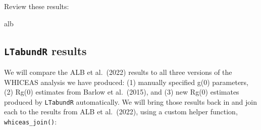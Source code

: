 \documentclass[
]{book}
\newenvironment{Shaded}{\begin{snugshade}}{\end{snugshade}}
\newcommand{\NormalTok}[1]{#1}
\begin{document}
Review these results:

\begin{Shaded}
\begin{Highlighting}[]
\NormalTok{alb}
\end{Highlighting}
\end{Shaded}

\hypertarget{ltabundr-results}{%
\subsection*{\texorpdfstring{\texttt{LTabundR} results}{LTabundR results}}\label{ltabundr-results}}

We will compare the ALB et al.~(2022) results to all three versions of the WHICEAS analysis we have produced: (1) manually specified g(0) parameters, (2) Rg(0) estimates from Barlow et al.~(2015), and (3) new Rg(0) estimates produced by \texttt{LTabundR} automatically. We will bring those results back in and join each to the results from ALB et al.~(2022), using a custom helper function, \texttt{whiceas\_join()}:
\end{document}
